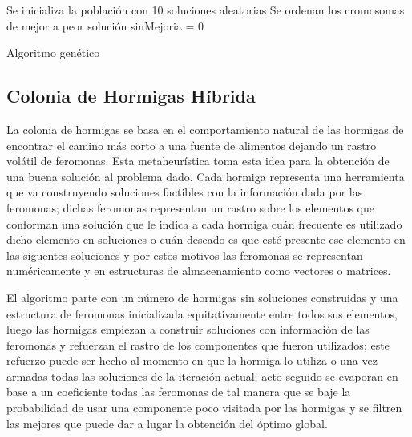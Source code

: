 \documentclass{ci5652}
\begin{document}
\begin{algorithm}
 \label{alg5}
 \DontPrintSemicolon
 \vspace*{0.1cm}
 Se inicializa la población con 10 soluciones aleatorias \;
 Se ordenan los cromosomas de mejor a peor solución \;
 sinMejoria = 0 \;
 \vspace*{0.1cm}
 \caption{Algoritmo genético}
\end{algorithm}

\subsection{Colonia de Hormigas Híbrida}

La colonia de hormigas se basa en el comportamiento natural de las hormigas de encontrar el camino más corto a una fuente de alimentos dejando un rastro volátil de feromonas. Esta metaheurística toma esta idea para la obtención de una buena solución al problema dado. Cada hormiga representa una herramienta que va construyendo soluciones factibles con la información dada por las feromonas; dichas feromonas representan un rastro sobre los elementos que conforman una solución que le indica a cada hormiga cuán frecuente es utilizado dicho elemento en soluciones o cuán deseado es que esté presente ese elemento en las siguentes soluciones y por estos motivos las feromonas se representan numéricamente y en estructuras de almacenamiento como vectores o matrices.

El algoritmo parte con un número de hormigas sin soluciones construidas y una estructura de feromonas inicializada equitativamente entre todos sus elementos, luego las hormigas empiezan a construir soluciones con información de las feromonas y refuerzan el rastro de los componentes que fueron utilizados; este refuerzo puede ser hecho al momento en que la hormiga lo utiliza o una vez armadas todas las soluciones de la iteración actual; acto seguido se evaporan en base a un coeficiente todas las feromonas de tal manera que se baje la probabilidad de usar una componente poco visitada por las hormigas y se filtren las mejores que puede dar a lugar la obtención del óptimo global.
\end{document}
